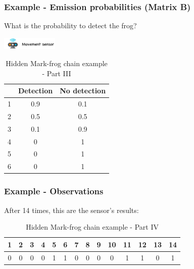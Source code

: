 \documentclass[xcolor=dvipsnames, compress]{beamer}
\begin{document}
\begin{frame}
\frametitle{Example - Emission probabilities (Matrix B)}
What is the probability to detect the frog?

	\begin{center}
	\includegraphics[width=0.2\textwidth]{images/sensor.png}
	\end{center}

\begin{center}
	\begin{table}
		\begin{centering}
			\begin{tabular}{|c|c|c|}
				\hline 
				& Detection & No detection\tabularnewline
				\hline 
				\hline 
				1 & 0.9 & 0.1\tabularnewline
				\hline 
				2 & 0.5 & 0.5\tabularnewline
				\hline 
				3 & 0.1 & 0.9\tabularnewline
				\hline 
				4 & 0 & 1\tabularnewline
				\hline 
				5 & 0 & 1\tabularnewline
				\hline 
				6 & 0 & 1\tabularnewline
				\hline 
			\end{tabular}
			\par\end{centering}
		\caption{Hidden Mark-frog chain example - Part III}
	\end{table}
	\par\end{center}
\end{frame}

\begin{frame}
\frametitle{Example - Observations}
After 14 times, this are the sensor\textquoteright s results: 
\begin{center}
	\begin{table}
		\begin{centering}
			\begin{tabular}{|c|c|c|c|c|c|c|c|c|c|c|c|c|c|}
				\hline 
				1 & 2 & 3 & 4 & 5 & 6 & 7 & 8 & 9 & 10 & 11 & 12 & 13 & 14\tabularnewline
				\hline 
				\hline 
				0 & 0 & 0 & 0 & 1 & 1 & 0 & 0 & 0 & 0 & 1 & 1 & 0 & 1\tabularnewline
				\hline 
			\end{tabular}
			\par\end{centering}
		\caption{Hidden Mark-frog chain example - Part IV}
	\end{table}
	\par\end{center}
\end{frame}
\end{document}
